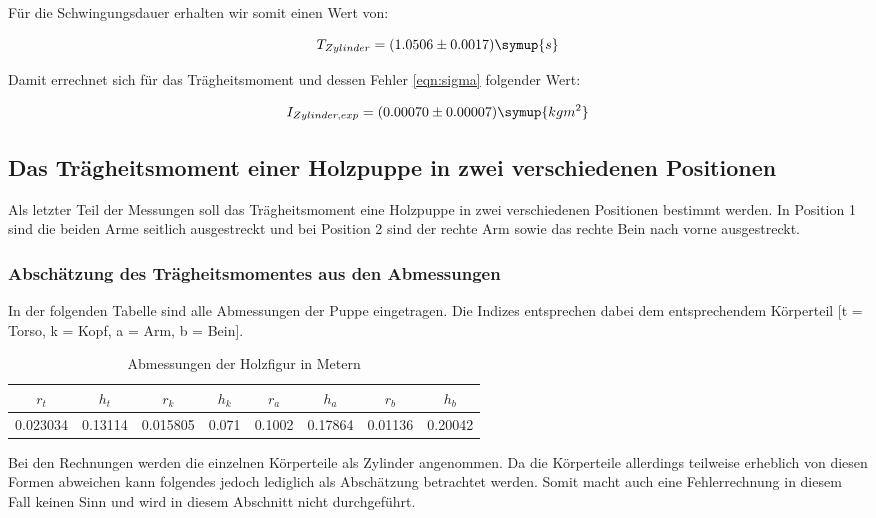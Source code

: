 Für die Schwingungsdauer erhalten wir somit einen Wert von:

\begin{equation}
  T_{Zylinder} = (1.0506 \pm 0.0017) \symup{s}
\end{equation}

Damit errechnet sich für das Trägheitsmoment und dessen Fehler \eqref{eqn:sigma} folgender Wert:

\begin{equation}
  I_{Zylinder,exp} = (0.00070 \pm 0.00007)  \symup{kg m^2}
\end{equation}

\newpage

\subsection{Das Trägheitsmoment einer Holzpuppe in zwei verschiedenen Positionen}

Als letzter Teil der Messungen soll das Trägheitsmoment eine Holzpuppe in zwei verschiedenen
Positionen bestimmt werden. In Position 1 sind die beiden Arme seitlich ausgestreckt und
bei Position 2 sind der rechte Arm sowie das rechte Bein nach vorne ausgestreckt.


\subsubsection{Abschätzung des Trägheitsmomentes aus den Abmessungen}
In der folgenden Tabelle sind alle Abmessungen der Puppe eingetragen. Die Indizes entsprechen
dabei dem entsprechendem Körperteil [t = Torso, k = Kopf, a = Arm, b = Bein].

\begin{table}
  \centering
  \caption{Abmessungen der Holzfigur in Metern}
  \begin{tabular}{c c c c c c c c}
    \toprule $r_t$ & $h_t$ & $r_k$ & $h_k$ & $r_a$ & $h_a$ & $r_b$ & $h_b$ \\
    \midrule 0.023034 & 0.13114 & 0.015805 & 0.071 & 0.1002 & 0.17864 & 0.01136 & 0.20042 \\
    \bottomrule
  \end{tabular}
\end{table}

Bei den Rechnungen werden die einzelnen Körperteile als Zylinder angenommen. Da die Körperteile
allerdings teilweise erheblich von diesen Formen abweichen kann folgendes jedoch lediglich als
Abschätzung betrachtet werden. Somit macht auch eine Fehlerrechnung in diesem Fall keinen Sinn
und wird in diesem Abschnitt nicht durchgeführt.

